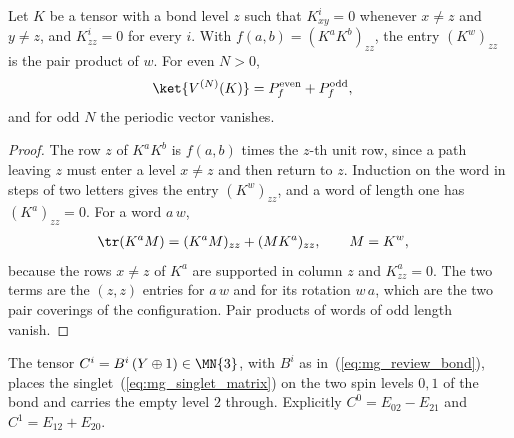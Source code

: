 \begin{lemma}%
    \label{thm:mps_pair_covering_form}
    \leanok
    Let $K$ be a tensor with a bond level $z$ such that $K^i_{xy}=0$ whenever
    $x\neq z$ and $y\neq z$, and $K^i_{zz}=0$ for every $i$. With
    $f(a,b)=(K^aK^b)_{zz}$, the entry $(K^w)_{zz}$ is the pair product of $w$.
    For even $N>0$,
    \begin{align}
        \ket{V^{(N)}(K)} & = P^{\mathrm{even}}_f+P^{\mathrm{odd}}_f,
        \label{eq:mg_pair_vector}
    \end{align}
    and for odd $N$ the periodic vector vanishes.
\end{lemma}

\begin{proof}
    \leanok
    The row $z$ of $K^aK^b$ is $f(a,b)$ times the $z$-th unit row, since a path
    leaving $z$ must enter a level $x\neq z$ and then return to $z$. Induction
    on the word in steps of two letters gives the entry $(K^w)_{zz}$, and a word
    of length one has $(K^a)_{zz}=0$. For a word $a\,w$,
    \begin{align}
        \tr(K^aM) & = (K^aM)_{zz}+(MK^a)_{zz},
        \qquad M=K^{w},
        \label{eq:mg_pair_trace}
    \end{align}
    because the rows $x\neq z$ of $K^a$ are supported in column $z$ and
    $K^a_{zz}=0$. The two terms are the $(z,z)$ entries for $a\,w$ and for its
    rotation $w\,a$, which are the two pair coverings of the configuration.
    Pair products of words of odd length vanish.
\end{proof}

\begin{definition}%
    \label{def:majumdar_ghosh_bond_singlet_tensor}
    \leanok
    The tensor $C^i=B^i\,(Y\oplus1)\in\MN{3}$, with $B^i$ as
    in~(\ref{eq:mg_review_bond}), places the singlet~(\ref{eq:mg_singlet_matrix})
    on the two spin levels $0,1$ of the bond and carries the empty level $2$
    through. Explicitly $C^0=E_{02}-E_{21}$ and $C^1=E_{12}+E_{20}$.
\end{definition}

